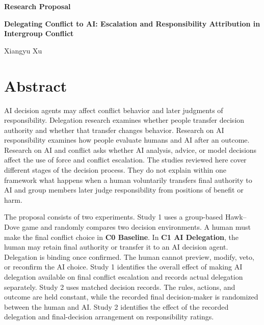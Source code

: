 \documentclass[11pt,a4paper]{article}
\newcommand{\Baseline}{\textbf{C0 Baseline}}
\newcommand{\AID}{\textbf{C1 AI Delegation}}
\begin{document}
\begin{titlepage}
\centering
\vspace*{2.5cm}
{\sffamily\bfseries\color{navy}\LARGE Research Proposal\par}
\vspace{1.2cm}
{\sffamily\bfseries\Huge Delegating Conflict to AI: Escalation and Responsibility Attribution in Intergroup Conflict\par}
\vspace{1.5cm}
{\sffamily\Large Xiangyu Xu\par}
\vspace{0.8cm}
\vspace{0.2cm}
\vfill
\end{titlepage}

\section*{Abstract}

AI decision agents may affect conflict behavior and later judgments of responsibility. Delegation research examines whether people transfer decision authority and whether that transfer changes behavior. Research on AI responsibility examines how people evaluate humans and AI after an outcome. Research on AI and conflict asks whether AI analysis, advice, or model decisions affect the use of force and conflict escalation. The studies reviewed here cover different stages of the decision process. They do not explain within one framework what happens when a human voluntarily transfers final authority to AI and group members later judge responsibility from positions of benefit or harm.

The proposal consists of two experiments. Study 1 uses a group-based Hawk--Dove game and randomly compares two decision environments. A human must make the final conflict choice in \Baseline{}. In \AID{}, the human may retain final authority or transfer it to an AI decision agent. Delegation is binding once confirmed. The human cannot preview, modify, veto, or reconfirm the AI choice. Study 1 identifies the overall effect of making AI delegation available on final conflict escalation and records actual delegation separately. Study 2 uses matched decision records. The rules, actions, and outcome are held constant, while the recorded final decision-maker is randomized between the human and AI. Study 2 identifies the effect of the recorded delegation and final-decision arrangement on responsibility ratings.
\end{document}
